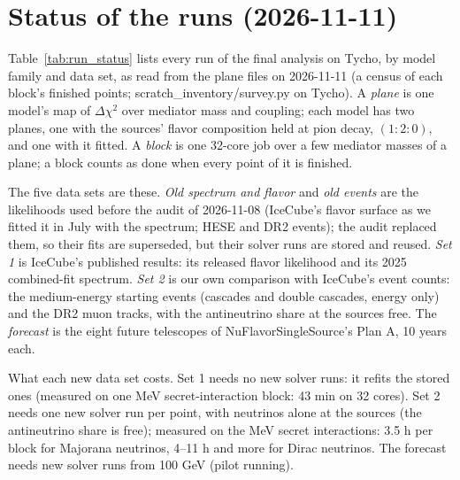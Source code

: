 \documentclass[11pt,a4paper]{article}
\begin{document}
\section{Status of the runs (2026-11-11)}
\label{sec:run_status}

Table~\ref{tab:run_status} lists every run of the final analysis on Tycho, by model family and data set, as read from
the plane files on 2026-11-11 (a census of each block's finished points; scratch\_inventory/survey.py on Tycho). A
\emph{plane} is one model's map of $\Delta\chi^2$ over mediator mass and coupling; each model has two planes, one with
the sources' flavor composition held at pion decay, $(1:2:0)$, and one with it fitted. A \emph{block} is one 32-core job
over a few mediator masses of a plane; a block counts as done when every point of it is finished.

The five data sets are these. \emph{Old spectrum and flavor} and \emph{old events} are the likelihoods used before the
audit of 2026-11-08 (IceCube's flavor surface as we fitted it in July with the spectrum; HESE and DR2 events); the audit
replaced them, so their fits are superseded, but their solver runs are stored and reused. \emph{Set 1} is IceCube's
published results: its released flavor likelihood and its 2025 combined-fit spectrum. \emph{Set 2} is our own
comparison with IceCube's event counts: the medium-energy starting events (cascades and double cascades, energy only)
and the DR2 muon tracks, with the antineutrino share at the sources free. The \emph{forecast} is the eight future
telescopes of NuFlavorSingleSource's Plan A, 10 years each.

What each new data set costs. Set 1 needs no new solver runs: it refits the stored ones (measured on one MeV
secret-interaction block: 43 min on 32 cores). Set 2 needs one new solver run per point, with neutrinos alone at the
sources (the antineutrino share is free); measured on the MeV secret interactions: 3.5 h per block for Majorana
neutrinos, 4--11 h and more for Dirac neutrinos. The forecast needs new solver runs from 100 GeV (pilot running).
\end{document}
